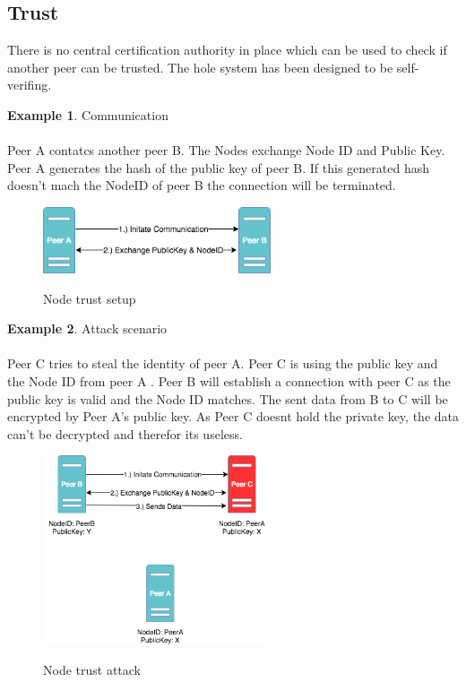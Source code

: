 \documentclass[a4paper,11pt, oneside]{report}
\theoremstyle{definition}
\newtheorem{exmp}{Example}[subsection]
\begin{document}
\subsection{Trust}
There is no central certification authority in place which can be used to check if another peer can be trusted. The hole system has been designed to be self-verifing.\\[0.3cm]
\begin{exmp} Communication\\ \\
Peer A contatcs another peer B. The Nodes exchange Node ID and Public Key.
Peer A generates the hash of the public key of peer B. If this generated hash doesn't mach the NodeID of peer B the connection will be terminated.\\[0.3cm]
\begin{figure}[H]
\centering
\includegraphics[width=0.6\textwidth]{img/ipfs_peerstrust_scenario_a.png}\\[0.8cm]
\caption[Node trust]{Node trust setup}
\end{figure}
\end{exmp}
\newpage
\begin{exmp}  Attack scenario\\ \\
Peer C tries to steal the identity of peer A. Peer C is using the public key and the Node ID from peer A . Peer B will establish a connection with peer C as the public key is valid and the Node ID matches. The sent data from B to C will be encrypted by Peer A's public key. As Peer C doesnt hold the private key, the data can't be decrypted and therefor its useless.
\begin{figure}[H]
\centering
\includegraphics[width=0.6\textwidth]{img/ipfs_peertrust_scenario_attack.png}\\[0.8cm]
\caption[Node trust attack]{Node trust attack}
\end{figure}
\end{exmp}
\end{document}
